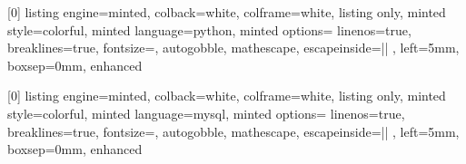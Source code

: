 \renewcommand{\theFancyVerbLine}{\color{mGray800}{\bfseries\footnotesize\arabic{FancyVerbLine}}}

[0]{
    listing engine=minted,
    colback=white,
    colframe=white,
    listing only,
    minted style=colorful,
    minted language=python,
    minted options={
        linenos=true,
        breaklines=true,
        fontsize=\footnotesize,
        autogobble,
        mathescape,
        escapeinside=||
    },
    left=5mm,
    boxsep=0mm,
    enhanced
}

[0]{
    listing engine=minted,
    colback=white,
    colframe=white,
    listing only,
    minted style=colorful,
    minted language=mysql,
    minted options={
        linenos=true,
        breaklines=true,
        fontsize=\footnotesize,
        autogobble,
        mathescape,
        escapeinside=||
    },
    left=5mm,
    boxsep=0mm,
    enhanced
}


\newenvironment{outlinedbox}[1]
{
    \begin{tcolorbox}
    [ %
        breakable, boxrule = 1pt, boxsep = 2mm, arc = 3mm,
        left = 2mm, right = 2mm, top = 2mm, bottom = 2mm,
        colback = white, colframe = mGray900
    ] %
    \begin{center}
        \large\textit{#1}
    \end{center}
} {
    \end{tcolorbox}
}

\newenvironment{bluebox}[1][]
{
    \begin{tcolorbox}
    [ %
        breakable, boxrule = 1pt, boxsep = 0mm, arc = 1mm,
        left = 2mm, right = 2mm, top = 2mm, bottom = 2mm,
        colback = mBlue50, colframe = mBlue200
    ] %
    \faCube \; \ilc{\textbf{#1}} \\[-5pt]
} {
    \end{tcolorbox}
}

\newenvironment{orangebox}[1][]
{
    \begin{tcolorbox}
    [ %
        breakable, boxrule = 1pt, boxsep = 0mm, arc = 1mm,
        left = 2mm, right = 2mm, top = 2mm, bottom = 2mm,
        colback = mOrange50, colframe = mOrange200
    ] %
    \faHtml5 \, \ilc{\textbf{#1}} \\[3mm]
} {
    \end{tcolorbox}
}

\newcommand{\sidebyside}[2]
{
    \begin{figure}[ht]
        \begin{subfigure}[t]{0.5\textwidth}
            \raggedright
            \texttt{[image: \\pres/\#1]}
        \end{subfigure}
        \begin{subfigure}{0.5\textwidth}
            #2
        \end{subfigure}
    \end{figure}
}

\endinput